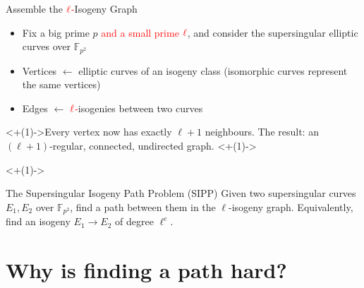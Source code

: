 \documentclass[10pt,aspectratio=169]{beamer}
\begin{document}
\begin{frame}{Assemble the $\mathcolor{red}{\ell}$\textcolor{red}{-}Isogeny Graph}
  \begin{itemize}
    \item Fix a big prime $p$ \textcolor{red}{and a small prime} $\mathcolor{red}{\ell}$, and consider the supersingular elliptic curves over $\mathbb{F}_{p^2}$
    \item Vertices $\leftarrow$ elliptic curves of an isogeny class (isomorphic curves represent the same vertices)
    \item Edges $\leftarrow$ $\mathcolor{red}{\ell}$\textcolor{red}{-}isogenies between two curves
  \end{itemize}
  \onslide<+(1)->{Every vertex now has \alert{exactly} $\ell + 1$ neighbours.
  The result: an $(\ell+1)$-regular, connected, undirected graph.}
  \onslide<+(1)->{%
  \begin{center}
  \end{center}}
  \onslide<+(1)->{%
  \begin{alertblock}{The Supersingular Isogeny Path Problem (SIPP)}
    Given two supersingular curves $E_1, E_2$ over $\mathbb{F}_{p^2}$, find a \alert{path} between them
    in the $\ell$-isogeny graph. Equivalently, find an isogeny $E_1 \to E_2$ of degree $\ell^e$.
  \end{alertblock}}
\end{frame}


\section{Why is finding a path hard?}

\end{document}
